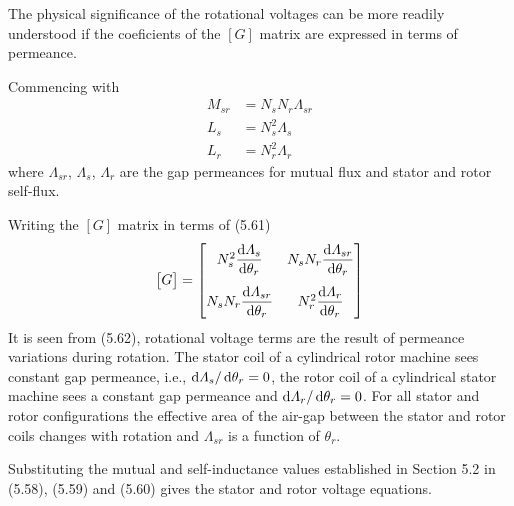 \documentclass[a4paper,numbers=noenddot,12pt]{scrbook}
\begin{document}
    The physical significance of the rotational voltages can be more readily understood if the coeficients of the $[G]$ matrix are expressed in terms of permeance.

    Commencing with
    \begin{equation}
        \begin{aligned}
            M_{sr} & = N_s N_r \varLambda_{sr}\\
            L_s & = N_s^2 \varLambda_s\\
            L_r & = N_r^2 \varLambda_r
        \end{aligned}
    \end{equation}
    where $\varLambda_{sr}$, $\varLambda_s$, $\varLambda_r$ are the gap permeances for mutual flux and stator and rotor self-flux.

    Writing the $[G]$ matrix in terms of (5.61)
    \begin{equation}
        \begin{bmatrix}
            G
        \end{bmatrix} = 
        \begin{bmatrix}
            N_s^2 \dfrac{\dif \varLambda_s}{\dif \theta_r} & N_s N_r \dfrac{\dif \varLambda_{sr}}{\dif \theta_r} \\[3ex]
            N_s N_r \dfrac{\dif \varLambda_{sr}}{\dif \theta_r} & N_r^2 \dfrac{\dif \varLambda_r}{\dif \theta_r}  
        \end{bmatrix}
    \end{equation}
    It is seen from (5.62), rotational voltage terms are the result of permeance variations during rotation. The stator coil of a cylindrical rotor machine sees constant gap permeance, i.e., $\dif \varLambda_s / \dif \theta_r = 0$, the rotor coil of a cylindrical stator machine sees a constant gap permeance and $\dif \varLambda_r / \dif \theta_r = 0$. For all stator and rotor configurations the effective area of the air-gap between the stator and rotor coils changes with rotation and $\varLambda_{sr}$ is a function of $\theta_r$.

    Substituting the mutual and self-inductance values established in Section 5.2 in (5.58), (5.59) and (5.60) gives the stator and rotor voltage equations. 
\end{document}

